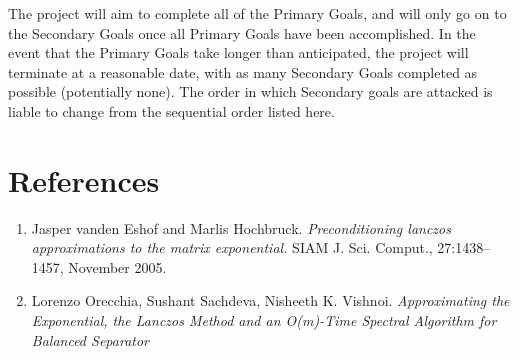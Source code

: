 \documentclass[a4paper, fleqn]{article}
\begin{document}
The project will aim to complete all of the Primary Goals, and will only go on to the Secondary Goals once all Primary Goals have been accomplished. In the event that the Primary Goals take longer than anticipated, the project will terminate at a reasonable date, with as many Secondary Goals completed as possible (potentially none). The order in which Secondary goals are attacked is liable to change from the sequential order listed here.

\section*{References}%
\label{sec:references}
\begin{enumerate}
        \item Jasper vanden Eshof and Marlis Hochbruck. \textit{Preconditioning lanczos approximations to the matrix exponential.} SIAM J. Sci. Comput., 27:1438–1457, November 2005.
        \item Lorenzo Orecchia, Sushant Sachdeva, Nisheeth K. Vishnoi. \textit{Approximating the Exponential, the Lanczos Method and an O(m)-Time Spectral Algorithm for Balanced Separator}
\end{enumerate}
\end{document}
